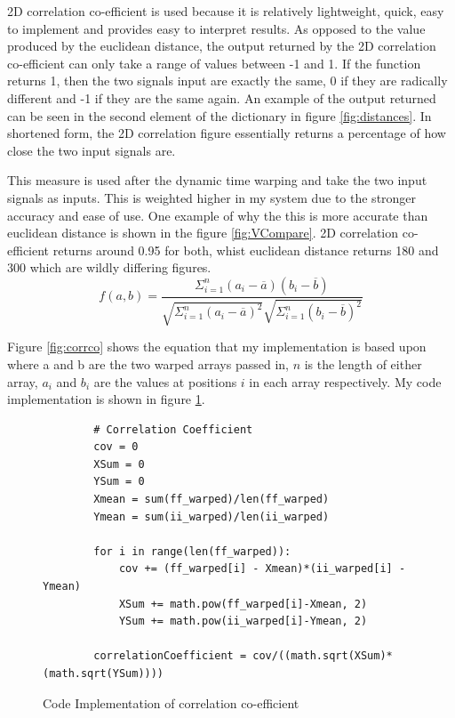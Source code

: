 \documentclass[10pt,a4paper]{report}
\begin{document}
2D correlation co-efficient is used because it is relatively lightweight, quick, easy to implement and provides easy to interpret results. As opposed to the value produced by the euclidean distance, the output returned by the 2D correlation co-efficient can only take a range of values between -1 and 1. If the function returns 1, then the two signals input are exactly the same, 0 if they are radically different and -1 if they are the same again. An example of the output returned can be seen in the second element of the dictionary in figure \ref{fig:distances}. In shortened form, the 2D correlation figure essentially returns a percentage of how close the two input signals are.

This measure is used after the dynamic time warping and take the two input signals as inputs. This is weighted higher in my system due to the stronger accuracy and ease of use. One example of why the this is more accurate than euclidean distance is shown in the figure \ref{fig:VCompare}. 2D correlation co-efficient returns around 0.95 for both, whist euclidean distance returns 180 and 300 which are wildly differing figures.
\begin{equation}
	f(a,b) = \frac{\Sigma^n_{i=1}(a_i-\overline{a})(b_i - \overline{b})}{\sqrt{\Sigma^n_{i=1} (a_i-\overline{a})^2}\sqrt{\Sigma^n_{i=1}(b_i-\overline{b})^2}}
	\label{fig:corrco}
\end{equation}

Figure \ref{fig:corrco} shows the equation that my implementation is based upon where a and b are the two warped arrays passed in, \(n\) is the length of either array, \(a_i\) and \(b_i\) are the values at positions \(i\) in each array respectively. My code implementation is shown in figure \ref{fig:CodeCorr}.

\begin{figure}[h!]
	\begin{lstlisting}
		# Correlation Coefficient
        cov = 0
        XSum = 0
        YSum = 0
        Xmean = sum(ff_warped)/len(ff_warped)
        Ymean = sum(ii_warped)/len(ii_warped)
                    
       	for i in range(len(ff_warped)):
        	cov += (ff_warped[i] - Xmean)*(ii_warped[i] - Ymean)
            XSum += math.pow(ff_warped[i]-Xmean, 2)
            YSum += math.pow(ii_warped[i]-Ymean, 2)
                            
        correlationCoefficient = cov/((math.sqrt(XSum)*(math.sqrt(YSum))))
       \end{lstlisting}
       \caption{Code Implementation of correlation co-efficient}
       \label{fig:CodeCorr}
\end{figure}
\end{document}
